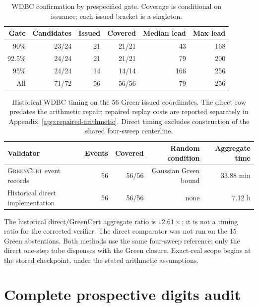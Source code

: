 \documentclass{article}
\newcommand{\method}{\textsc{GreenCert}}
\begin{document}
\begin{table}[H]
\caption{WDBC confirmation by prespecified gate.  Coverage is conditional on
issuance; each issued bracket is a singleton.}
\label{tab:wdbc}
\centering
\small
\setlength{\tabcolsep}{7pt}
\begin{tabular}{rrrrrr}
\toprule
Gate & Candidates & Issued & Covered & Median lead & Max lead \\
\midrule
90\%   & 23/24 & 21 & 21/21 & 43  & 168 \\
92.5\% & 24/24 & 21 & 21/21 & 79  & 200 \\
95\%   & 24/24 & 14 & 14/14 & 166 & 256 \\
\midrule
All     & 71/72 & 56 & 56/56 & 79  & 256 \\
\bottomrule
\end{tabular}
\end{table}

\begin{table}[H]
\caption{Historical WDBC timing on the 56 Green-issued coordinates.
The direct row predates the arithmetic repair; repaired replay costs are
reported separately in Appendix~\ref{app:repaired-arithmetic}.  Direct timing
excludes construction of the shared four-sweep centerline.}
\label{tab:wdbc-direct}
\centering
\small
\setlength{\tabcolsep}{5pt}
\begin{tabular}{lrrrr}
\toprule
Validator & Events & Covered & Random condition & Aggregate time \\
\midrule
\method{} event records & 56 & 56/56 & Gaussian Green bound & 33.88 min \\
Historical direct implementation & 56 & 56/56 & none & 7.12 h \\
\bottomrule
\end{tabular}
\end{table}

The historical direct/GreenCert aggregate ratio is $12.61\times$; it is not a
timing ratio for the corrected verifier.  The direct comparator was not run on
the 15 Green abstentions.  Both methods use the same four-sweep reference;
only the direct one-step tube dispenses with the Green closure.  Exact-real
scope begins at the stored checkpoint, under the stated arithmetic assumptions.

\section{Complete prospective digits audit}
\label{app:digits-audit}
\end{document}
